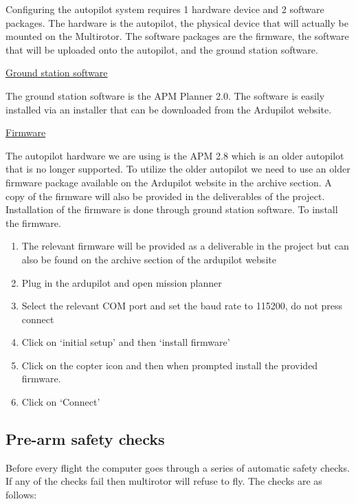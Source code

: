 Configuring the autopilot system requires 1 hardware device and 2 software packages. The hardware is the autopilot, the physical device that will actually be mounted on the Multirotor. The software packages are the firmware, the software that will be uploaded onto the autopilot, and the ground station software.

\underline{Ground station software}

The ground station software is the APM Planner 2.0. The software is easily installed via an installer that can be downloaded from the Ardupilot website.

\underline{Firmware}

The autopilot hardware we are using is the APM 2.8 which is an older autopilot that is no longer supported. To utilize the older autopilot we need to use an older firmware package available on the Ardupilot website in the archive section. A copy of the firmware will also be provided in the deliverables of the project. Installation of the firmware is done through ground station software.
To install the firmware.

\begin{enumerate}

    \item The relevant firmware will be provided as a deliverable in the project but can also be found on the archive section of the ardupilot website
    \item Plug in the ardupilot and open mission planner
    \item Select the relevant COM port and set the baud rate to 115200, do not press connect
    \item Click on ‘initial setup’ and then ‘install firmware’
    \item Click on the copter icon and then when prompted install the provided firmware.
    \item Click on ‘Connect’
    
\end{enumerate}

\subsection{Pre-arm safety checks}

Before every flight the computer goes through a series of automatic safety checks. If any of the checks fail then multirotor will refuse to fly. The checks are as follows:

